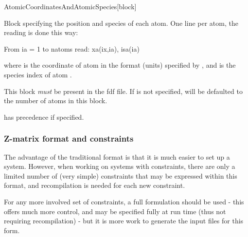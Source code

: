 \begin{fdfentry}{AtomicCoordinatesAndAtomicSpecies}[block]

  Block specifying the position and species of each atom.  One line
  per atom, the reading is done this way:
  \begin{shellexample}
       From ia = 1 to natoms
            read: xa(ix,ia), isa(ia)
  \end{shellexample}
  where  is the  coordinate of atom
   in the format (units) specified by
  , and  is the species
  index of atom .

  \note This block \emph{must} be present in the fdf file. If
   is not specified,  will be
  defaulted to the number of atoms in this block.

  \note {} has precedence if specified.
  
\end{fdfentry}


\subsubsection{Z-matrix format and constraints}
\label{sec:Zmatrix}

The advantage of the traditional format is that it is
much easier to set up a system. However, when working
on systems with constraints, there are only a limited
number of (very simple) constraints that may be expressed
within this format, and recompilation is needed for each
new constraint.

For any more involved set of constraints, a
full  formulation should be used - this
offers much more control, and may be specified fully at
run time (thus not requiring recompilation) - but
it is more work to generate the input files for this form.


